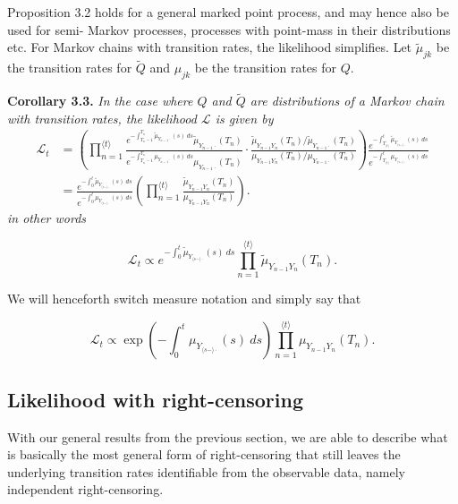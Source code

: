 \documentclass[a4paper,10pt,openany]{book}
\begin{document}
Proposition 3.2 holds for a general marked point process, and may hence also be used for semi- Markov processes, processes with point-mass in their distributions etc. For Markov chains with transition rates, the likelihood simplifies. Let \(\tilde \mu_{jk}\) be the transition rates for \(\tilde Q\) and \(\mu_{jk}\) be the transition rates for \(Q\).

\textbf{Corollary 3.3.} \emph{In the case where \(Q\) and \(\tilde Q\) are distributions of a Markov chain with transition rates, the likelihood \(\mathcal L\) is given by}
\begin{align*}
\mathcal L_t&=\left(\prod_{n=1}^{\langle t\rangle} \frac{e^{-\int_{T_n-1}^{T_n}\tilde \mu_{Y_{n-1}\cdot}(s)\ ds}\tilde \mu_{Y_{n-1}\cdot}(T_n)}{e^{-\int_{T_n-1}^{T_n} \mu_{Y_{n-1}\cdot}(s)\ ds} \mu_{Y_{n-1}\cdot}(T_n)}\cdot \frac{\tilde \mu_{Y_{n-1}Y_n}(T_n)/\tilde \mu_{Y_{n-1}\cdot }(T_n)}{\mu_{Y_{n-1}Y_n}(T_n)/\mu_{Y_{n-1}\cdot }(T_n)}\right)\frac{e^{-\int_{T_{\langle t\rangle}}^t \tilde \mu_{Y_{\langle s-\rangle \cdot}}(s)\ ds}}{e^{-\int_{T_{\langle t\rangle}}^t  \mu_{Y_{\langle s-\rangle \cdot}}(s)\ ds}}\\
&=\frac{e^{-\int_0^t \tilde \mu_{Y_{\langle s-\rangle \cdot}}(s)\ ds}}{e^{-\int_0^t  \mu_{Y_{\langle s-\rangle \cdot}}(s)\ ds}}\left(\prod_{n=1}^{\langle t\rangle} \frac{\tilde \mu_{Y_{n-1}Y_n}(T_n)}{\mu_{Y_{n-1}Y_n}(T_n)}\right).
\end{align*}
\emph{in other words}

\[
\mathcal L_t\propto e^{-\int_0^t \tilde \mu_{Y_{\langle s-\rangle \cdot}}(s)\ ds}\prod_{n=1}^{\langle t\rangle} \tilde \mu_{Y_{n-1}Y_n}(T_n).
\]

We will henceforth switch measure notation and simply say that

\[
\mathcal L_t\propto \exp\left(-\int_0^t  \mu_{Y_{\langle s-\rangle \cdot}}(s)\ ds\right)\prod_{n=1}^{\langle t\rangle}  \mu_{Y_{n-1}Y_n}(T_n).
\]

\hypertarget{likelihood-with-right-censoring}{%
\subsection{Likelihood with right-censoring}\label{likelihood-with-right-censoring}}

With our general results from the previous section, we are able to describe what is basically the most general form of right-censoring that still leaves the underlying transition rates identifiable from the observable data, namely independent right-censoring.
\end{document}
